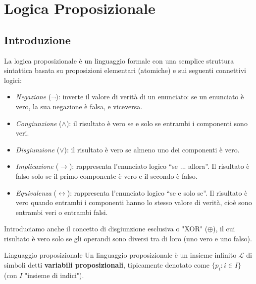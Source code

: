 \documentclass[a4paper,11pt]{report}
\begin{document}
\makefrontpage

\tableofcontents

\chapter{Logica Proposizionale}

\section{Introduzione}

La logica proposizionale è un linguaggio formale con una semplice struttura sintattica basata su proposizioni elementari (atomiche) e sui seguenti connettivi logici:


\begin{itemize}
    \item \textit{Negazione} ($\neg$): inverte il valore di verità di un enunciato: se un enunciato è vero, la sua negazione è falsa, e viceversa.

    \item \textit{Congiunzione} ($\land$): il risultato è vero se e solo se entrambi i componenti sono veri.

    \item \textit{Disgiunzione} ($\lor$): il risultato è vero se almeno uno dei componenti è vero.

    \item \textit{Implicazione} ($\to$): rappresenta l’enunciato logico “se ... allora”. Il risultato è falso solo se il primo componente è vero e il secondo è falso. 

    \item \textit{Equivalenza} ($\leftrightarrow$): rappresenta l’enunciato logico “se e solo se”. 
        Il risultato è vero quando entrambi i componenti hanno lo stesso valore di verità, cioè sono entrambi veri o entrambi falsi.
\end{itemize}

Introduciamo anche il concetto di disgiunzione esclusiva o "XOR" (\( \oplus \)), il cui risultato è vero solo se gli operandi sono diversi tra di loro (uno vero e uno falso).

\begin{defbox}{Linguaggio proposizionale}{}
    Un linguaggio proposizionale è un insieme infinito \( \mathcal{L} \) di simboli detti \textbf{variabili proposizionali}, tipicamente denotato come \( \{p_i : i \in I\} \) {\color{gray} (con \( I \) "insieme di indici")}.
\end{defbox}
\end{document}
